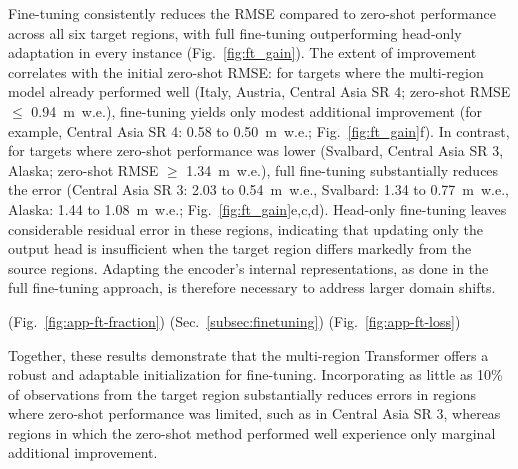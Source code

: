 \documentclass[draft]{agujournal2019}
\begin{document}
Fine-tuning consistently reduces the RMSE compared to zero-shot performance across all six target regions, with full fine-tuning outperforming head-only adaptation in every instance (Fig.~\ref{fig:ft_gain}). The extent of improvement correlates with the initial zero-shot RMSE: for targets where the multi-region model already performed well (Italy, Austria, Central Asia SR 4; zero-shot RMSE $\leq$ 0.94~m~w.e.), fine-tuning yields only modest additional improvement (for example, Central Asia SR 4: 0.58 to 0.50~m~w.e.; Fig.~\ref{fig:ft_gain}f). In contrast, for targets where zero-shot performance was lower (Svalbard, Central Asia SR 3, Alaska; zero-shot RMSE $\geq$ 1.34~m~w.e.), full fine-tuning substantially reduces the error (Central Asia SR 3: 2.03 to 0.54~m~w.e., Svalbard: 1.34 to 0.77~m~w.e., Alaska: 1.44 to 1.08~m~w.e.; Fig.~\ref{fig:ft_gain}e,c,d). Head-only fine-tuning leaves considerable residual error in these regions, indicating that updating only the output head is insufficient when the target region differs markedly from the source regions. Adapting the encoder's internal representations, as done in the full fine-tuning approach, is therefore necessary to address larger domain shifts. 


 (Fig.~\ref{fig:app-ft-fraction}) (Sec.~\ref{subsec:finetuning}) (Fig.~\ref{fig:app-ft-loss})

Together, these results demonstrate that the multi-region Transformer offers a robust and adaptable initialization for fine-tuning. Incorporating as little as 10\% of observations from the target region substantially reduces errors in regions where zero-shot performance was limited, such as in Central Asia SR 3, whereas regions in which the zero-shot method performed well experience only marginal additional improvement. 
\end{document}
